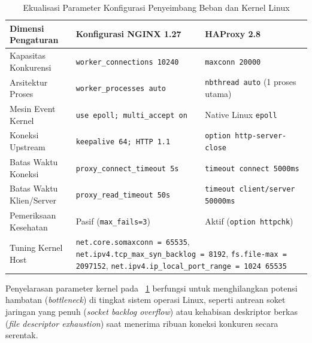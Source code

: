 \begin{table}[H]
    \centering
    \caption{Ekualisasi Parameter Konfigurasi Penyeimbang Beban dan Kernel Linux}
    \label{tab:ekualisasi_parameter}
    \small
    \begin{tabularx}{\textwidth}{|p{3.4cm}|X|X|}
        \hline
        \rowcolor[gray]{0.85}
        \textbf{Dimensi Pengaturan} & \textbf{Konfigurasi NGINX 1.27} & \textbf{HAProxy 2.8} \\
        \hline
        Kapasitas Konkurensi & \texttt{worker\_connections 10240} & \texttt{maxconn 20000} \\
        \hline
        Arsitektur Proses & \texttt{worker\_processes auto} & \texttt{nbthread auto} (1 proses utama) \\
        \hline
        Mesin Event Kernel & \texttt{use epoll; multi\_accept on} & Native Linux \texttt{epoll} \\
        \hline
        Koneksi Upstream & \texttt{keepalive 64; HTTP 1.1} & \texttt{option http-server-close} \\
        \hline
        Batas Waktu Koneksi & \texttt{proxy\_connect\_timeout 5s} & \texttt{timeout connect 5000ms} \\
        \hline
        Batas Waktu Klien/Server & \texttt{proxy\_read\_timeout 50s} & \texttt{timeout client/server 50000ms} \\
        \hline
        Pemeriksaan Kesehatan & Pasif (\texttt{max\_fails=3}) & Aktif (\texttt{option httpchk}) \\
        \hline
        Tuning Kernel Host & \multicolumn{2}{p{9.3cm}|}{\raggedright \texttt{net.core.somaxconn = 65535}, \texttt{net.ipv4.tcp\_max\_syn\_backlog = 8192}, \texttt{fs.file-max = 2097152}, \texttt{net.ipv4.ip\_local\_port\_range = 1024 65535}} \\
        \hline
    \end{tabularx}
\end{table}

Penyelarasan parameter kernel pada \tablename\ \ref{tab:ekualisasi_parameter} berfungsi untuk menghilangkan potensi hambatan (\textit{bottleneck}) di tingkat sistem operasi Linux, seperti antrean soket jaringan yang penuh (\textit{socket backlog overflow}) atau kehabisan deskriptor berkas (\textit{file descriptor exhaustion}) saat menerima ribuan koneksi konkuren secara serentak.

